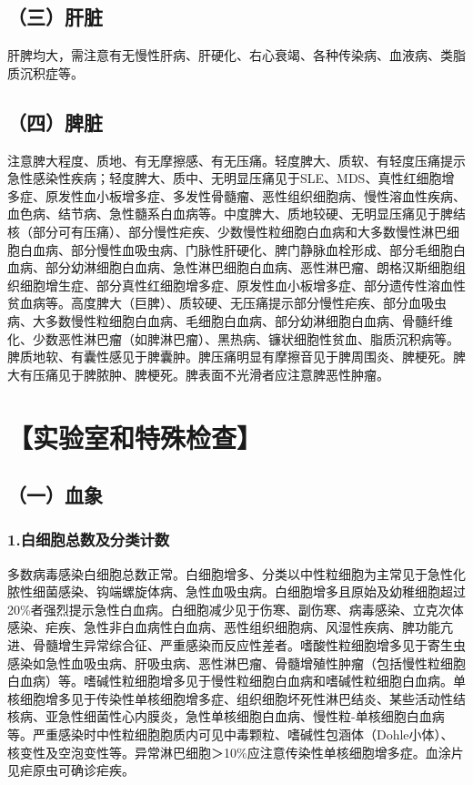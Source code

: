 \subsection{（三）肝脏}

肝脾均大，需注意有无慢性肝病、肝硬化、右心衰竭、各种传染病、血液病、类脂质沉积症等。

\subsection{（四）脾脏}

注意脾大程度、质地、有无摩擦感、有无压痛。轻度脾大、质软、有轻度压痛提示急性感染性疾病；轻度脾大、质中、无明显压痛见于SLE、MDS、真性红细胞增多症、原发性血小板增多症、多发性骨髓瘤、恶性组织细胞病、慢性溶血性疾病、血色病、结节病、急性髓系白血病等。中度脾大、质地较硬、无明显压痛见于脾结核（部分可有压痛）、部分慢性疟疾、少数慢性粒细胞白血病和大多数慢性淋巴细胞白血病、部分慢性血吸虫病、门脉性肝硬化、脾门静脉血栓形成、部分毛细胞白血病、部分幼淋细胞白血病、急性淋巴细胞白血病、恶性淋巴瘤、朗格汉斯细胞组织细胞增生症、部分真性红细胞增多症、原发性血小板增多症、部分遗传性溶血性贫血病等。高度脾大（巨脾）、质较硬、无压痛提示部分慢性疟疾、部分血吸虫病、大多数慢性粒细胞白血病、毛细胞白血病、部分幼淋细胞白血病、骨髓纤维化、少数恶性淋巴瘤（如脾淋巴瘤）、黑热病、镰状细胞性贫血、脂质沉积病等。脾质地软、有囊性感见于脾囊肿。脾压痛明显有摩擦音见于脾周围炎、脾梗死。脾大有压痛见于脾脓肿、脾梗死。脾表面不光滑者应注意脾恶性肿瘤。

\section{【实验室和特殊检查】}

\subsection{（一）血象}

\subsubsection{1.白细胞总数及分类计数}

多数病毒感染白细胞总数正常。白细胞增多、分类以中性粒细胞为主常见于急性化脓性细菌感染、钩端螺旋体病、急性血吸虫病。白细胞增多且原始及幼稚细胞超过20\%者强烈提示急性白血病。白细胞减少见于伤寒、副伤寒、病毒感染、立克次体感染、疟疾、急性非白血病性白血病、恶性组织细胞病、风湿性疾病、脾功能亢进、骨髓增生异常综合征、严重感染而反应性差者。嗜酸性粒细胞增多见于寄生虫感染如急性血吸虫病、肝吸虫病、恶性淋巴瘤、骨髓增殖性肿瘤（包括慢性粒细胞白血病）等。嗜碱性粒细胞增多见于慢性粒细胞白血病和嗜碱性粒细胞白血病。单核细胞增多见于传染性单核细胞增多症、组织细胞坏死性淋巴结炎、某些活动性结核病、亚急性细菌性心内膜炎，急性单核细胞白血病、慢性粒-单核细胞白血病等。严重感染时中性粒细胞胞质内可见中毒颗粒、嗜碱性包涵体（Dohle小体）、核变性及空泡变性等。异常淋巴细胞＞10\%应注意传染性单核细胞增多症。血涂片见疟原虫可确诊疟疾。

